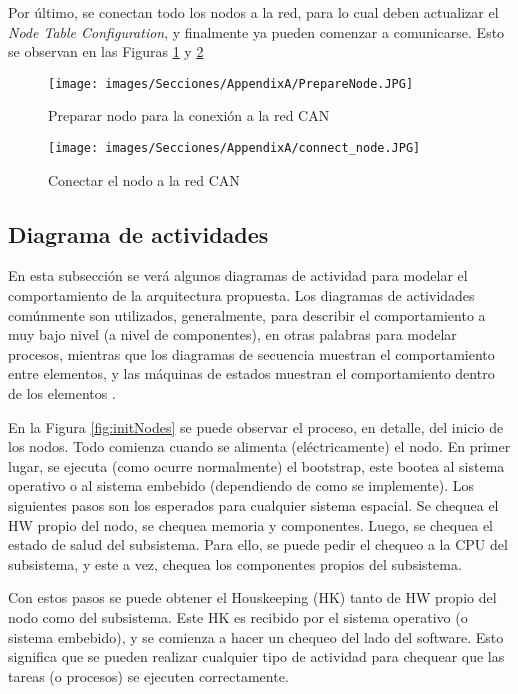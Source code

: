 Por último, se conectan todo los nodos a la red, para lo cual deben
actualizar el \textit{Node Table Configuration}, y finalmente ya
pueden comenzar a comunicarse. Esto se observan en las Figuras
\ref{fig:PrepareNodeC5} y \ref{fig:ConnectNodeC5}

\begin{figure}[h!]
 \centering
 \texttt{[image: images/Secciones/AppendixA/PrepareNode.JPG]}
  \caption{Preparar nodo para la conexión a la red CAN}
  \label{fig:PrepareNodeC5}
\end{figure}

\begin{figure}[h!]
 \centering
 \texttt{[image: images/Secciones/AppendixA/connect\_node.JPG]}
  \caption{Conectar el nodo a la red CAN}
  \label{fig:ConnectNodeC5}
\end{figure}

\subsection{Diagrama de actividades}
En esta subsección se verá algunos diagramas de actividad para modelar
el comportamiento de la arquitectura propuesta. Los diagramas de actividades
comúnmente son utilizados, generalmente, para describir el comportamiento
a muy bajo nivel (a nivel de componentes), en otras palabras para modelar
procesos, mientras que los diagramas de secuencia muestran el comportamiento
entre elementos, y las máquinas de estados  muestran el comportamiento
dentro de los elementos \citep{HoltPery}.

En la Figura \ref{fig:initNodes} se puede observar el proceso, en detalle,
del inicio de los nodos. Todo comienza cuando se alimenta (eléctricamente)
el nodo. En primer lugar, se ejecuta (como ocurre normalmente) el bootstrap,
este bootea al sistema operativo o al sistema embebido (dependiendo de como
se implemente). Los siguientes pasos son los esperados para cualquier sistema
espacial. Se chequea el \ac{HW} propio del nodo, se chequea memoria y componentes.
Luego, se chequea el estado de salud del subsistema. Para ello, se puede pedir
el chequeo a la CPU del subsistema, y este a vez, chequea los componentes
propios del subsistema.

Con estos pasos se puede obtener el Houskeeping (HK) tanto de \ac{HW} propio del nodo
como del subsistema. Este HK es recibido por el sistema operativo
(o sistema embebido), y se comienza a hacer un chequeo del lado del
software. Esto significa que se pueden realizar cualquier tipo de actividad
para chequear que las tareas (o procesos) se ejecuten correctamente.

